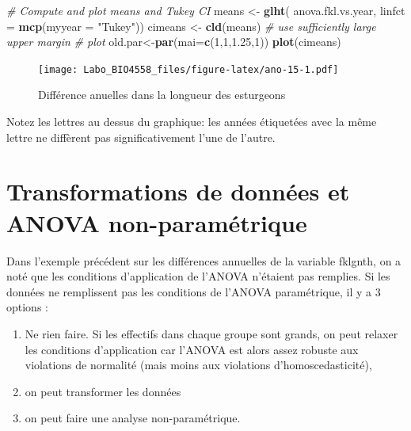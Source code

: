 \documentclass[12pt,]{book}
\newenvironment{Shaded}{\begin{snugshade}}{\end{snugshade}}
\newcommand{\CommentTok}[1]{\textcolor[rgb]{0.56,0.35,0.01}{\textit{#1}}}
\newcommand{\DataTypeTok}[1]{\textcolor[rgb]{0.13,0.29,0.53}{#1}}
\newcommand{\DecValTok}[1]{\textcolor[rgb]{0.00,0.00,0.81}{#1}}
\newcommand{\FloatTok}[1]{\textcolor[rgb]{0.00,0.00,0.81}{#1}}
\newcommand{\KeywordTok}[1]{\textcolor[rgb]{0.13,0.29,0.53}{\textbf{#1}}}
\newcommand{\NormalTok}[1]{#1}
\newcommand{\StringTok}[1]{\textcolor[rgb]{0.31,0.60,0.02}{#1}}
\providecommand{\tightlist}{%
  \setlength{\itemsep}{0pt}\setlength{\parskip}{0pt}}
\begin{document}
\begin{Shaded}
\begin{Highlighting}[]
\CommentTok{# Compute and plot means and Tukey CI}
\NormalTok{means <-}\StringTok{ }\KeywordTok{glht}\NormalTok{(}
\NormalTok{  anova.fkl.vs.year,}
  \DataTypeTok{linfct =} \KeywordTok{mcp}\NormalTok{(}\DataTypeTok{myyear =} \StringTok{"Tukey"}\NormalTok{))}
\NormalTok{cimeans <-}\StringTok{ }\KeywordTok{cld}\NormalTok{(means)}
\CommentTok{# use sufficiently large upper margin}
\CommentTok{# plot}
\NormalTok{old.par<-}\KeywordTok{par}\NormalTok{(}\DataTypeTok{mai=}\KeywordTok{c}\NormalTok{(}\DecValTok{1}\NormalTok{,}\DecValTok{1}\NormalTok{,}\FloatTok{1.25}\NormalTok{,}\DecValTok{1}\NormalTok{))}
\KeywordTok{plot}\NormalTok{(cimeans)}
\end{Highlighting}
\end{Shaded}

\begin{figure}
\centering
\texttt{[image: Labo\_BIO4558\_files/figure-latex/ano-15-1.pdf]}
\caption{\label{fig:ano-15}Différence anuelles dans la longueur des esturgeons}
\end{figure}

Notez les lettres au dessus du graphique: les années étiquetées avec la même lettre ne diffèrent pas significativement l'une de l'autre.

\hypertarget{transformations-de-donnuxe9es-et-anova-non-paramuxe9trique}{%
\section{Transformations de données et ANOVA non-paramétrique}\label{transformations-de-donnuxe9es-et-anova-non-paramuxe9trique}}

Dans l'exemple précédent sur les différences annuelles de la variable fklgnth, on a noté que les conditions d'application de l'ANOVA n'étaient pas remplies. Si les données ne remplissent pas les conditions de l'ANOVA paramétrique, il y a 3 options :

\begin{enumerate}
\def\labelenumi{\arabic{enumi}.}
\tightlist
\item
  Ne rien faire. Si les effectifs dans chaque groupe sont grands, on peut relaxer les conditions d'application car l'ANOVA est alors assez robuste aux violations de normalité (mais moins aux violations d'homoscedasticité),
\item
  on peut transformer les données
\item
  on peut faire une analyse non-paramétrique.
\end{enumerate}
\end{document}

